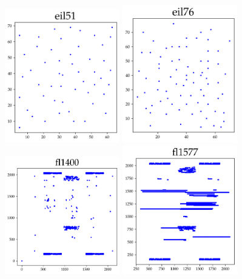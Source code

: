 \begin{appendices}
\begin{figure}[H]
\centering
\includegraphics[width=5cm]{../tsplib_euc2d_pictures_of_instances/eil51.png}
\includegraphics[width=5cm]{../tsplib_euc2d_pictures_of_instances/eil76.png}
\includegraphics[width=5cm]{../tsplib_euc2d_pictures_of_instances/fl1400.png}
\includegraphics[width=5cm]{../tsplib_euc2d_pictures_of_instances/fl1577.png}

\end{figure}
\end{appendices}

